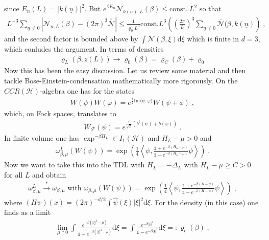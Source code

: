 \documentclass[
a4paper, %
11pt, %
onecolumn, %
openany, %
]{memoir}
\theoremstyle{definition}
\theoremstyle{remark}
\theoremstyle{plain}
\begin{document}
since $E_{\underline{n}}(L)=|k(\underline{n})|^2$. But $e^{\beta E_{\underline{n}}}\mathcal{N}_{k(\underline{n}),L}(\beta)\leq \mathrm{const.~}L^2$ so that \begin{align}
L^{-3}\sum_{\underline{n}\neq 0} \left|\mathcal{N}_{\underline{n},L}(\beta)-(2\pi)^3\overline{\overline{\mathcal{N}}}\right| \leq \frac{1}{\varrho_0 L^3}\mathrm{const.}L^3 \left(\left(\frac{2\pi}{L}\right)^3\sum_{\underline{n}\neq 0}\overline{\mathcal{N}}(\beta,k(\underline{n})\right)\;,
\end{align}
and the second factor is bounded above by $\int\overline{\mathcal{N}}(\beta,\xi)\mathrm{d}\xi$ which is finite in $d=3$, which conludes the argument. In terms of densities \begin{align}
\varrho_L(\beta,z(L))\rightarrow \varrho_0(\beta)=\varrho_C(\beta)+\varrho_0
\end{align}
Now this has been the easy discussion. Let us review some material and then tackle Bose-Einstein-condensation mathematically more rigorously. On the $CCR(\mathcal{H})$-algebra one has for the states \begin{align}
W(\psi)W(\varphi)=e^{\frac{i}{2}\mathrm{Im}\langle\psi,\varphi\rangle}W(\psi+\phi)\; ,\end{align}
which, on Fock spaces, translates to \begin{align}
W_{\mathcal{F}}(\psi)=e^{\frac{i}{\sqrt{2}}(b^{\dagger}(\psi)+b(\psi))}\;.
\end{align}
In finite volume one has $\exp^{-\beta H_L}\in I_1(\mathcal{H})$ and $H_{L}-\mu >0$ and \begin{align}
\omega_{\beta,\mu}^L(W(\psi))=\exp\left(\frac{1}{4}\left\langle \psi,\frac{\mathds{1}+e^{-\beta(H_L-\mu)}}{\mathds{1}-e^{-\beta(H_L-\mu)}}\psi\right\rangle\right)\; .
\end{align}
Now we want to take this into the TDL with $H_L=-\Delta_L$ with $H_L-\mu\geq C>0$ for all $L$ and obtain\begin{align}
\omega_{\beta,\mu}^L\overset{*}{\longrightarrow}\omega_{\beta,\mu} \text{ with } \omega_{\beta,\mu}(W(\psi))=\exp\left(\frac{1}{4}\left\langle \psi,\frac{\mathds{1}+e^{-\beta(H-\mu)}}{\mathds{1}-e^{-\beta(H-\mu)}}\psi\right\rangle\right)\; ,
\end{align}
where $(H\psi)(x)=(2\pi)^{-d/2}\int\hat{\psi}(\xi)|\xi|^2\mathrm{d}\xi$. For the density (in this case) one finds as a limit \begin{align}
\lim_{\mu\uparrow 0}\int\frac{e^{-\beta(|\xi|^2-\mu)}}{\mathds{1}-e^{-\beta(|\xi|^2-\mu)}}\mathrm{d}\xi = \int\frac{e^{-\beta|\xi|^2}}{\mathds{1}-e^{-\beta|\xi|^2}}\mathrm{d}\xi =: \varrho_{c}(\beta)\; ,\label{eqn::crit_rho}
\end{align}
\end{document}
